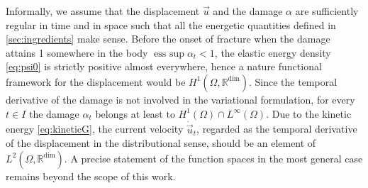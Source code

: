 \begin{remark}
Informally, we assume that the displacement $\vec{u}$ and the damage $\alpha$ are sufficiently regular in time and in space such that all the energetic quantities defined in \cref{sec:ingredients} make sense. Before the onset of fracture when the damage attains 1 somewhere in the body $\operatorname{ess\ sup}\alpha_t< 1$, the elastic energy density \eqref{eq:psi0} is strictly positive almost everywhere, hence a nature functional framework for the displacement would be $H^1(\Omega,\mathbb{R}^\mathrm{dim})$. Since the temporal derivative of the damage is not involved in the variational formulation, for every $t\in I$ the damage $\alpha_t$ belongs at least to $H^1(\Omega)\cap L^\infty(\Omega)$. Due to the kinetic energy \eqref{eq:kineticG}, the current velocity $\dot{\vec{u}}_t$, regarded as the temporal derivative of the displacement in the distributional sense, should be an element of $L^2(\Omega,\mathbb{R}^\mathrm{dim})$. A precise statement of the function spaces in the most general case remains beyond the scope of this work.
\end{remark}

